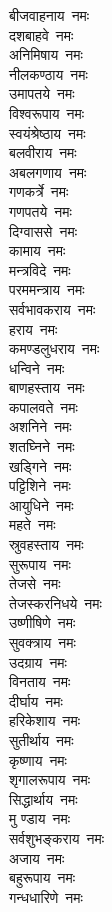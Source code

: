 \begin{multicols}{2}
\begin{flushleft}
बीजवाहनाय~नमः\hfill{}\\
दशबाहवे~नमः\\
अनिमिषाय~नमः\\
नीलकण्ठाय~नमः\\
उमापतये~नमः\\
विश्वरूपाय~नमः\\
स्वयंश्रेष्ठाय~नमः\\
बलवीराय~नमः\\
अबलगणाय~नमः\\
गणकर्त्रे~नमः\\
गणपतये~नमः\hfill{}\\
दिग्वाससे~नमः\\
कामाय~नमः\\
मन्त्रविदे~नमः\\
परममन्त्राय~नमः\\
सर्वभावकराय~नमः\\
हराय~नमः\\
कमण्डलुधराय~नमः\\
धन्विने~नमः\\
बाणहस्ताय~नमः\\
कपालवते~नमः\hfill{}\\
अशनिने~नमः\\
शतघ्निने~नमः\\
खड्गिने~नमः\\
पट्टिशिने~नमः\\
आयुधिने~नमः\\
महते~नमः\\
स्रुवहस्ताय~नमः\\
सुरूपाय~नमः\\
तेजसे~नमः\\
तेजस्करनिधये~नमः\hfill{}\\
उष्णीषिणे~नमः\\
सुवक्त्राय~नमः\\
उदग्राय~नमः\\
विनताय~नमः\\
दीर्घाय~नमः\\
हरिकेशाय~नमः\\
सुतीर्थाय~नमः\\
कृष्णाय~नमः\\
शृगालरूपाय~नमः\\
सिद्धार्थाय~नमः\hfill{}\\
मु ण्डाय~नमः\\
सर्वशुभङ्कराय~नमः\\
अजाय~नमः\\
बहुरूपाय~नमः\\
गन्धधारिणे~नमः\\

\end{flushleft}
\end{multicols}
